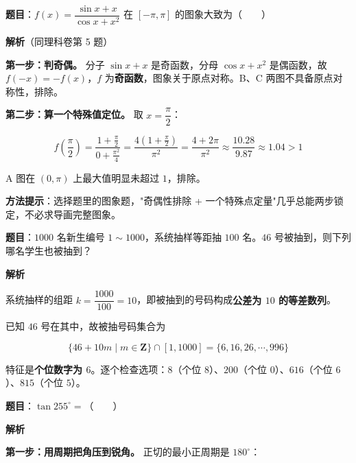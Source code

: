 \textbf{题目}：$f(x)=\dfrac{\sin x+x}{\cos x+x^{2}}$ 在 $[-\pi,\pi]$ 的图象大致为（　　）

\begin{center}\end{center}

\textbf{解析}（同理科卷第 5 题）

\textbf{第一步：判奇偶。} 分子 $\sin x+x$ 是奇函数，分母 $\cos x+x^{2}$ 是偶函数，故 $f(-x)=-f(x)$，$f$ 为\textbf{奇函数}，图象关于原点对称。B、C 两图不具备原点对称性，排除。

\textbf{第二步：算一个特殊值定位。} 取 $x=\dfrac\pi2$：

\[f\!\left(\frac\pi2\right)=\frac{1+\frac\pi2}{0+\frac{\pi^{2}}4}=\frac{4\left(1+\frac\pi2\right)}{\pi^{2}}=\frac{4+2\pi}{\pi^{2}}\approx\frac{10.28}{9.87}\approx1.04>1\]

A 图在 $\left(0,\pi\right)$ 上最大值明显未超过 $1$，排除。


\begin{gktip}
\textbf{方法提示}：选择题里的图象题，"奇偶性排除 + 一个特殊点定量"几乎总能两步锁定，不必求导画完整图象。
\end{gktip}

\par\medskip


\textbf{题目}：$1000$ 名新生编号 $1\sim1000$，系统抽样等距抽 $100$ 名。$46$ 号被抽到，则下列哪名学生也被抽到？

\textbf{解析}

系统抽样的组距 $k=\dfrac{1000}{100}=10$，即被抽到的号码构成\textbf{公差为 $10$ 的等差数列}。

已知 $46$ 号在其中，故被抽号码集合为

\[\{46+10m\mid m\in\mathbf Z\}\cap[1,1000]=\{6,16,26,\cdots,996\}\]

特征是\textbf{个位数字为 $6$}。逐个检查选项：$8$（个位 $8$）、$200$（个位 $0$）、$616$（个位 $6$ ）、$815$（个位 $5$）。


\par\medskip


\textbf{题目}：$\tan255^\circ=$（　　）

\textbf{解析}

\textbf{第一步：用周期把角压到锐角。} 正切的最小正周期是 $180^\circ$：


